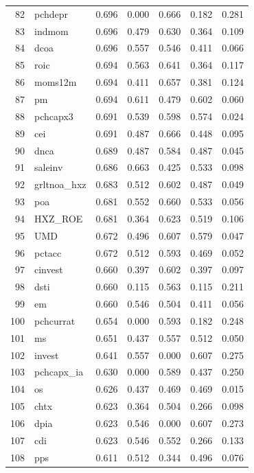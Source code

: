 \begin{footnotesize}
\begin{longtable}{rl|c|c|c|c|c}
  82 & pchdepr & 0.696 & 0.000 & 0.666 & 0.182 & 0.281 \\ 
  83 & indmom & 0.696 & 0.479 & 0.630 & 0.364 & 0.109 \\ 
  84 & dcoa & 0.696 & 0.557 & 0.546 & 0.411 & 0.066 \\ 
  85 & roic & 0.694 & 0.563 & 0.641 & 0.364 & 0.117 \\ 
  86 & moms12m & 0.694 & 0.411 & 0.657 & 0.381 & 0.124 \\ 
  87 & pm & 0.694 & 0.611 & 0.479 & 0.602 & 0.060 \\ 
  88 & pchcapx3 & 0.691 & 0.539 & 0.598 & 0.574 & 0.024 \\ 
  89 & cei & 0.691 & 0.487 & 0.666 & 0.448 & 0.095 \\ 
  90 & dnca & 0.689 & 0.487 & 0.584 & 0.487 & 0.045 \\ 
  91 & saleinv & 0.686 & 0.663 & 0.425 & 0.533 & 0.098 \\ 
  92 & grltnoa\_hxz & 0.683 & 0.512 & 0.602 & 0.487 & 0.049 \\ 
  93 & poa & 0.681 & 0.552 & 0.660 & 0.533 & 0.056 \\ 
  94 & HXZ\_ROE & 0.681 & 0.364 & 0.623 & 0.519 & 0.106 \\ 
  95 & UMD & 0.672 & 0.496 & 0.607 & 0.579 & 0.047 \\ 
  96 & pctacc & 0.672 & 0.512 & 0.593 & 0.469 & 0.052 \\ 
  97 & cinvest & 0.660 & 0.397 & 0.602 & 0.397 & 0.097 \\ 
  98 & dsti & 0.660 & 0.115 & 0.563 & 0.115 & 0.211 \\ 
  99 & em & 0.660 & 0.546 & 0.504 & 0.411 & 0.056 \\ 
  100 & pchcurrat & 0.654 & 0.000 & 0.593 & 0.182 & 0.248 \\ 
  101 & ms & 0.651 & 0.437 & 0.557 & 0.512 & 0.050 \\ 
  102 & invest & 0.641 & 0.557 & 0.000 & 0.607 & 0.275 \\ 
  103 & pchcapx\_ia & 0.630 & 0.000 & 0.589 & 0.437 & 0.250 \\ 
  104 & os & 0.626 & 0.437 & 0.469 & 0.469 & 0.015 \\ 
  105 & chtx & 0.623 & 0.364 & 0.504 & 0.266 & 0.098 \\ 
  106 & dpia & 0.623 & 0.546 & 0.000 & 0.607 & 0.273 \\ 
  107 & cdi & 0.623 & 0.546 & 0.552 & 0.266 & 0.133 \\ 
  108 & pps & 0.611 & 0.512 & 0.344 & 0.496 & 0.076 \\ 

\end{longtable}
\end{footnotesize}
